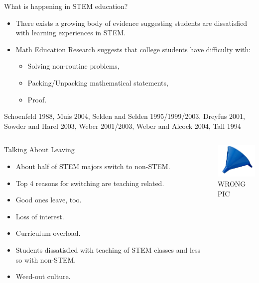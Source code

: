 \documentclass[10pt,handout]{beamer}
\begin{document}
\begin{frame}

\begin{block}{What is happening in STEM education?}
\begin{itemize}
\item There exists a growing body of evidence suggesting students are dissatisfied with learning experiences in STEM.
\item Math Education Research suggests that college students have difficulty with:
    \begin{itemize}\normalsize
    \item Solving non-routine problems,
    \item Packing/Unpacking mathematical statements,
    \item Proof.
    \end{itemize}
\end{itemize}

\vspace{1em}

Schoenfeld 1988, Muis 2004, Selden and Selden 1995/1999/2003, Dreyfus 2001, Sowder and Harel 2003, Weber 2001/2003, Weber and Alcock 2004, Tall 1994

\end{block}

\end{frame}


\begin{frame}

\begin{columns}[c]
\begin{block}{Talking About Leaving}
\begin{itemize}
\item About half of STEM majors switch to non-STEM.
\item Top 4 reasons for switching are teaching related.
\item Good ones leave, too.
\item Loss of interest.
\item Curriculum overload.
\item Students dissatisfied with teaching of STEM classes and less so with non-STEM.
\item Weed-out culture.
\end{itemize}
\end{block}
\begin{center}
\includegraphics[width=1in]{Funnel.jpg}\\
WRONG PIC
\end{center}
\end{columns}

\end{frame}
\end{document}
